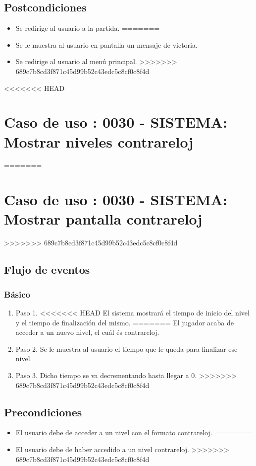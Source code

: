 \subsection{Postcondiciones}
\begin{itemize}
<<<<<<< HEAD
\item Se redirige al usuario a la partida.
=======
\item Se le muestra al usuario en pantalla un mensaje de victoria.
\item Se redirige al usuario al menú principal.
>>>>>>> 689c7b8cd3f871c45d99b52c43edc5c8cf0c8f4d
\end{itemize}



<<<<<<< HEAD
\section{Caso de uso : 0030 - SISTEMA: Mostrar niveles contrareloj}\label{sec:uc0}
=======
\section{Caso de uso : 0030 - SISTEMA: Mostrar pantalla contrareloj}\label{sec:uc0}
>>>>>>> 689c7b8cd3f871c45d99b52c43edc5c8cf0c8f4d
\subsection{Flujo de eventos}
\subsubsection{Básico}

\begin{enumerate}
\item Paso 1.
<<<<<<< HEAD
El sistema mostrará el tiempo de inicio del nivel y el tiempo de finalización del mismo.
=======
El jugador acaba de acceder a un nuevo nivel, el cuál és contrareloj.
\item Paso 2.
Se le muestra al usuario el tiempo que le queda para finalizar ese nivel.
\item Paso 3.
Dicho tiempo se va decrementando hasta llegar a 0.
>>>>>>> 689c7b8cd3f871c45d99b52c43edc5c8cf0c8f4d
\end{enumerate}

\subsection{Precondiciones}
\begin{itemize}
<<<<<<< HEAD
\item El usuario debe de acceder a un nivel con el formato contrareloj.
=======
\item El usuario debe de haber accedido a un nivel contrareloj.
>>>>>>> 689c7b8cd3f871c45d99b52c43edc5c8cf0c8f4d
\end{itemize}

